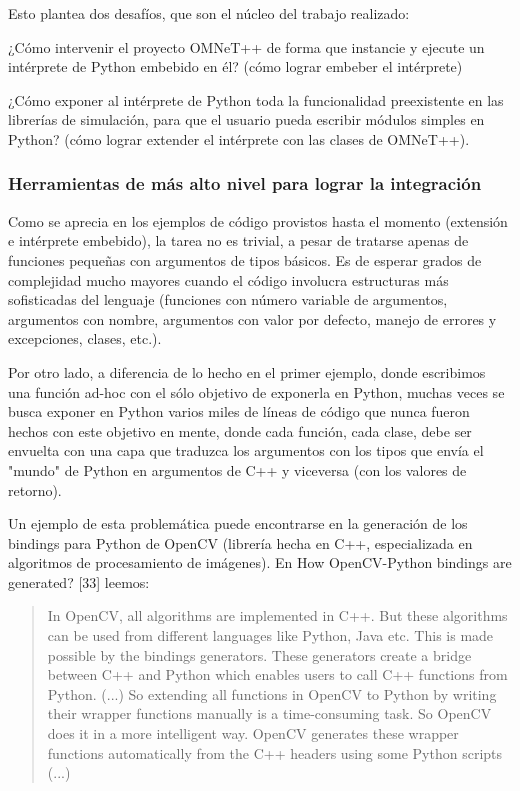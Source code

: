 \documentclass[]{article}
\begin{document}

Esto plantea dos desafíos, que son el núcleo del trabajo realizado:

¿Cómo intervenir el proyecto OMNeT++ de forma que instancie y ejecute un
intérprete de Python embebido en él? (cómo lograr embeber el intérprete)

¿Cómo exponer al intérprete de Python toda la funcionalidad preexistente en las
librerías de simulación, para que el usuario pueda escribir módulos simples en
Python? (cómo lograr extender el intérprete con las clases de OMNeT++).

\subsubsection{Herramientas de más alto nivel para lograr la integración}

Como se aprecia en los ejemplos de código provistos hasta el momento (extensión
e intérprete embebido), la tarea no es trivial, a pesar de tratarse apenas de
funciones pequeñas con argumentos de tipos básicos. Es de esperar grados de
complejidad mucho mayores cuando el código involucra estructuras más
sofisticadas del lenguaje (funciones con número variable de argumentos,
argumentos con nombre, argumentos con valor por defecto, manejo de errores y
excepciones, clases, etc.).

Por otro lado, a diferencia de lo hecho en el primer ejemplo, donde escribimos
una función ad-hoc con el sólo objetivo de exponerla en Python, muchas veces se
busca exponer en Python varios miles de líneas de código que nunca fueron
hechos con este objetivo en mente, donde cada función, cada clase, debe ser
envuelta con una capa que traduzca los argumentos con los tipos que envía el
"mundo" de Python en argumentos de C++ y viceversa (con los valores de
retorno).

Un ejemplo de esta problemática puede encontrarse en la generación de los
bindings para Python de OpenCV (librería hecha en C++, especializada en
algoritmos de procesamiento de imágenes). En How OpenCV-Python bindings are
generated? [33] leemos:


\begin{quotation}
In OpenCV, all algorithms are implemented in C++. But these algorithms can be
used from different languages like Python, Java etc. This is made possible by
the bindings generators. These generators create a bridge between C++ and
Python which enables users to call C++ functions from Python. (...)  So
extending all functions in OpenCV to Python by writing their wrapper functions
manually is a time-consuming task. So OpenCV does it in a more intelligent way.
OpenCV generates these wrapper functions automatically from the C++ headers
using some Python scripts (...)
\end{quotation}
\end{document}
